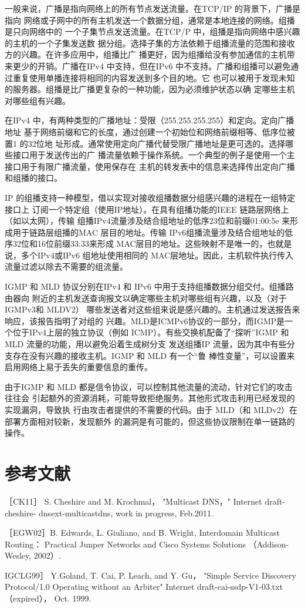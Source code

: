 一般来说，广播是指向网络上的所有节点发送流量。在TCP/IP 的背景下，广播是指向
网络或子网中的所有主机发送一个数据分组，通常是本地连接的网络。组播是只向网络中的
一个子集节点发送流量。在TCP/P 中，组播是指向网络中感兴趣的主机的一个子集发送数
据分组。选择子集的方法依赖于组播流量的范围和接收方的兴趣。在许多应用中，组播比广
播更好，因为组播给没有参加通信的主机带来更少的开销。广播在IPv4 中支持，但在IPv6
中不支持。广播和组播可以避免通过重复使用单播连接将相同的内容发送到多个目的地。它
也可以被用于发现未知的服务器。组播是比广播更复杂的一种功能，因为必须维护状态以确
定哪些主机对哪些组有兴趣。

在IPv4 中，有两种类型的广播地址：受限（255.255.255.255）和定向。定向广播地址
基于网络前缀和它的长度，通过创建一个初始位和网络前缀相等、低序位被置1 的32位地
址形成。通常使用定向广播代替受限广播地址是更可选的。选择哪些接口用于发送传出的广
播流量依赖于操作系统。一个典型的例子是使用一个主接口用于有限广播流量，使用保存在
主机的转发表中的信息来选择传出定向广播和组播的接口。

IP 的组播支持一种模型，借以实现对接收组播数据分组感兴趣的进程在一组特定接口上
订阅一个特定组（使用IP地址）。在具有组播功能的IEEE 链路层网络上（如以太网），传输
组播IPv4流量涉及结合组地址的低序23位和前缀01:00:5e 来形成用于链路层组播的MAC
层目的地址。传输 IPv6组播流量涉及结合组地址的低序32位和16位前缀33:33来形成
MAC层目的地址。这些映射不是唯一的，也就是说，多个IPv4或IPv6 组地址使用相同的
MAC层地址。因此，主机软件执行传入流量过滤以除去不需要的组流量。

IGMP 和 MLD 协议分别在IPv4 和 IPv6 中用于支持组播数据分组交付。组播路由器向
附近的主机发送查询报文以确定哪些主机对哪些组有兴趣，以及（对于 IGMPv3和 MLDV2）
哪些发送者对这些组来说是感兴趣的。主机通过发送报告来响应，该报告指明了对组的
兴趣。MLD是ICMPv6协议的一部分，而IGMP是一个位于IPv4上层的独立协议（例如
ICMP）。有些交换机配备了“探听”IGMP 和 MLD 流量的功能，用以避免沿着生成树分支
发送组播IP 流量，因为其中有些分支存在没有兴趣的接收主机。IGMP 和 MLD 有一个“鲁
棒性变量”，可以设置来启用网络上易于丢失的重要信息的重传。

由于IGMP 和 MLD 都是信令协议，可以控制其他流量的流动，针对它们的攻击往往会
引起额外的资源消耗，可能导致拒绝服务。其他形式攻击利用已经发现的实现漏洞，导致执
行由攻击者提供的不需要的代码。由于 MLD（和 MLDv2）在部署方面相对较新，发现额外
的漏洞是有可能的，但这些协议限制在单一链路的操作。

\section{参考文献}
［CK11］ S. Cheshire and M. Krochmal， "Multicast DNS，" Internet draft-cheshire-
dnsext-multicastdns, work in progress, Feb.2011.

［EGW02］B. Edwards, L. Giuliano, and B. Wright, Interdomain Multicast Routing：
Practical Junper Networks and Cisco Systems Solutions （Addison-Wesley, 2002）.

IGCLG99］ Y.Goland, T. Cai, P. Leach, and Y. Gu， "Simple Service Discovery
Protocol/1.0 Operating without an Arbiter" Internet draft-cai-ssdp-V1-03.txt
（expired）， Oct. 1999.
